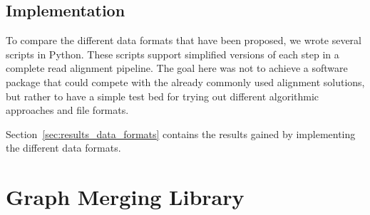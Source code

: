 \documentclass[a4paper,12pt,twoside,BCOR=10mm]{scrbook}
\begin{document}
\subsection{Implementation}
%

To compare the different data formats that have been proposed, 
we wrote several scripts in Python. 
These scripts support simplified versions of each step in a complete read alignment pipeline. 
The goal here was not to achieve a software package that could compete with 
the already commonly used alignment solutions, but rather to have a 
simple test bed for trying out different algorithmic approaches and file formats.

Section~\ref{sec:results_data_formats} contains the results gained by 
implementing the different data formats.

\section{Graph Merging Library}
%
\end{document}
